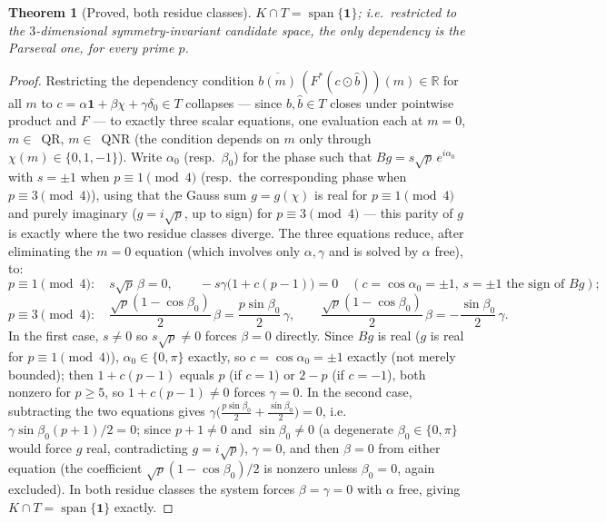 \documentclass[11pt]{article}
\theoremstyle{plain}
\newtheorem{theorem}{Theorem}[section]
\theoremstyle{definition}
\theoremstyle{remark}
\newcommand{\R}{\mathbb R}
\begin{document}
\begin{theorem}[Proved, both residue classes]\label{thm:E0}
$K\cap T=\operatorname{span}\{\mathbf1\}$; i.e.\ restricted to the
$3$-dimensional symmetry-invariant candidate space, the only dependency is
the Parseval one, for every prime $p$.
\end{theorem}
\begin{proof}
Restricting the dependency condition
$\overline{b(m)}\,(F^*(c\odot\hat b))(m)\in\R$ for all $m$ to
$c=\alpha\mathbf1+\beta\chi+\gamma\delta_0\in T$ collapses --- since
$b,\hat b\in T$ closes under pointwise product and $F$ --- to exactly
three scalar equations, one evaluation each at $m=0$, $m\in$~QR,
$m\in$~QNR (the condition depends on $m$ only through $\chi(m)\in\{0,1,-1\}$).
Write $\alpha_0$ (resp.\ $\beta_0$) for the phase such that $Bg=s\sqrt p\,e^{i\alpha_0}$
with $s=\pm1$ when $p\equiv1\pmod4$ (resp.\ the corresponding phase when
$p\equiv3\pmod4$), using that the Gauss sum $g=g(\chi)$ is real for
$p\equiv1\pmod4$ and purely imaginary ($g=i\sqrt p$, up to sign) for
$p\equiv3\pmod4$ --- this parity of $g$ is exactly where the two residue
classes diverge. The three equations reduce, after eliminating the
$m=0$ equation (which involves only $\alpha,\gamma$ and is solved by
$\alpha$ free), to:
$$p\equiv1\!\!\pmod4:\quad s\sqrt p\,\beta=0,\qquad -s\gamma\bigl(1+c(p-1)\bigr)=0\quad(c=\cos\alpha_0=\pm1,\,s=\pm1\text{ the sign of }Bg);$$
$$p\equiv3\!\!\pmod4:\quad \frac{\sqrt p(1-\cos\beta_0)}2\,\beta=\frac{p\sin\beta_0}2\,\gamma,
\qquad \frac{\sqrt p(1-\cos\beta_0)}2\,\beta=-\frac{\sin\beta_0}2\,\gamma.$$
In the first case, $s\ne0$ so $s\sqrt p\ne0$ forces $\beta=0$ directly.
Since $Bg$ is real ($g$ is real for $p\equiv1\pmod4$), $\alpha_0\in\{0,\pi\}$
exactly, so $c=\cos\alpha_0=\pm1$ exactly (not merely bounded); then
$1+c(p-1)$ equals $p$ (if $c=1$) or $2-p$ (if $c=-1$), both nonzero for
$p\ge5$, so $1+c(p-1)\ne0$ forces $\gamma=0$. In the second
case, subtracting the two equations gives
$\gamma\bigl(\tfrac{p\sin\beta_0}2+\tfrac{\sin\beta_0}2\bigr)=0$, i.e.\
$\gamma\sin\beta_0(p+1)/2=0$; since $p+1\ne0$ and $\sin\beta_0\ne0$ (a
degenerate $\beta_0\in\{0,\pi\}$ would force $g$ real, contradicting
$g=i\sqrt p$), $\gamma=0$, and then $\beta=0$ from either equation
(the coefficient $\sqrt p(1-\cos\beta_0)/2$ is nonzero unless
$\beta_0=0$, again excluded). In both residue classes the system forces
$\beta=\gamma=0$ with $\alpha$ free, giving $K\cap T=\operatorname{span}\{\mathbf1\}$
exactly.
\end{proof}
\end{document}
